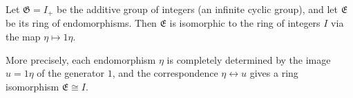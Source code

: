 Let $\mathfrak{G} = I_{+}$ be the additive group of integers (an infinite cyclic group), and let $\mathfrak{E}$ be its ring of endomorphisms. Then $\mathfrak{E}$ is isomorphic to the ring of integers $I$ via the map $\eta \mapsto 1\eta$.

More precisely, each endomorphism $\eta$ is completely determined by the image $u = 1\eta$ of the generator $1$, and the correspondence $\eta \leftrightarrow u$ gives a ring isomorphism $\mathfrak{E} \cong I$.
